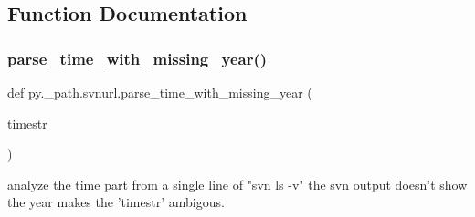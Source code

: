 \subsection{Function Documentation}
\mbox{\label{namespacepy_1_1__path_1_1svnurl_ad056bf2b52547d0adb336fe95e32f3fa}} 
\subsubsection{\texorpdfstring{parse\+\_\+time\+\_\+with\+\_\+missing\+\_\+year()}{parse\_time\_with\_missing\_year()}}
{\footnotesize\ttfamily def py.\+\_\+path.\+svnurl.\+parse\+\_\+time\+\_\+with\+\_\+missing\+\_\+year (\begin{DoxyParamCaption}\item[{}]{timestr }\end{DoxyParamCaption})}

\begin{DoxyVerb}analyze the time part from a single line of "svn ls -v"
the svn output doesn't show the year makes the 'timestr'
ambigous.
\end{DoxyVerb}
 